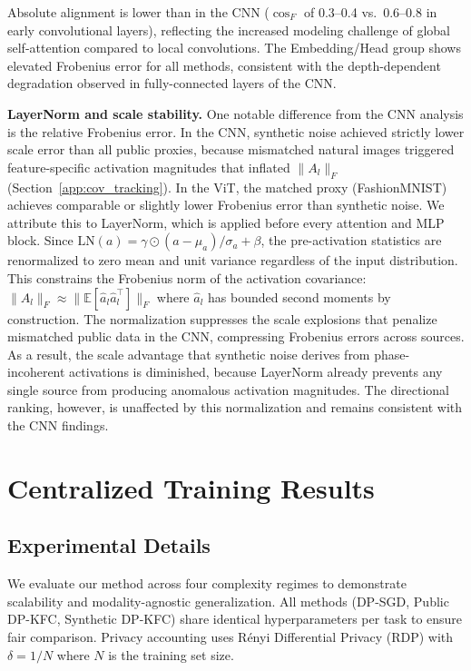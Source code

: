 \documentclass{article}
\theoremstyle{plain}
\theoremstyle{definition}
\theoremstyle{remark}
\begin{document}
  Absolute alignment is lower than in the CNN ($\cos_F$ of 0.3--0.4 vs.\ 0.6--0.8 in early convolutional layers), reflecting the increased modeling challenge of global self-attention
  compared to local convolutions. The Embedding/Head group shows elevated Frobenius error for all methods, consistent with the depth-dependent degradation observed in fully-connected
  layers of the CNN.

  \textbf{LayerNorm and scale stability.}
  One notable difference from the CNN analysis is the relative Frobenius error. In the CNN, synthetic noise achieved strictly lower scale error than all public proxies, because
  mismatched natural images triggered feature-specific activation magnitudes that inflated $\|A_l\|_F$ (Section~\ref{app:cov_tracking}). In the ViT, the matched proxy (FashionMNIST)
  achieves comparable or slightly lower Frobenius error than synthetic noise. We attribute this to LayerNorm, which is applied before every attention and MLP block. Since
  $\mathrm{LN}(a) = \gamma \odot (a - \mu_a) / \sigma_a + \beta$, the pre-activation statistics are renormalized to zero mean and unit variance regardless of the input distribution.
  This constrains the Frobenius norm of the activation covariance: $\|A_l\|_F \approx \|\mathbb{E}[\hat{a}_l \hat{a}_l^\top]\|_F$ where $\hat{a}_l$ has bounded second moments by
  construction. The normalization suppresses the scale explosions that penalize mismatched public data in the CNN, compressing Frobenius errors across sources. As a result, the scale
  advantage that synthetic noise derives from phase-incoherent activations is diminished, because LayerNorm already prevents any single source from producing anomalous activation
  magnitudes. The directional ranking, however, is unaffected by this normalization and remains consistent with the CNN findings.


\clearpage
\section{Centralized Training Results}
\label{app:table_centralized}

\subsection{Experimental Details}
We evaluate our method across four complexity regimes to demonstrate scalability and modality-agnostic generalization. All methods (DP-SGD, Public DP-KFC, Synthetic DP-KFC) share identical hyperparameters per task to ensure fair comparison. Privacy accounting uses Rényi Differential Privacy (RDP) with $\delta = 1/N$ where $N$ is the training set size.
\end{document}

